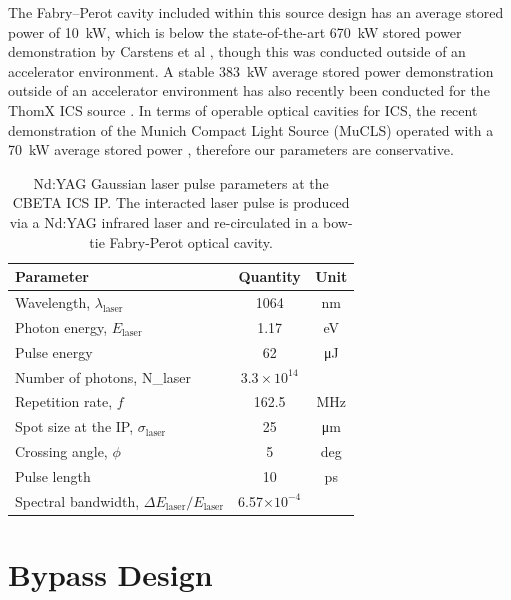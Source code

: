 \documentclass[../main.tex]{subfiles}
\begin{document}
The Fabry--Perot cavity included within this source design has an average stored power of 10~\si{\kilo\watt}, which is below the state-of-the-art 670~\si{\kilo\watt} stored power demonstration by Carstens et al \cite{carstens2014megawatt}, though this was conducted outside of an accelerator environment. A stable 383~\si{\kilo\watt} average stored power demonstration outside of an accelerator environment has also recently been conducted for the ThomX ICS source \cite{liu2018optical}. In terms of operable optical cavities for ICS, the recent demonstration of the Munich Compact Light Source (MuCLS) operated with a 70~\si{\kilo\watt} average stored power \cite{eggl2016munich}, therefore our parameters are conservative.   
\begin{table}[!h]
\centering
\caption{Nd:YAG Gaussian laser pulse parameters at the CBETA ICS IP. The interacted laser pulse is produced via a Nd:YAG infrared laser and re-circulated in a bow-tie Fabry-Perot optical cavity.}
\begin{tabular}{lcc}
\hline\hline
Parameter & Quantity & Unit \\
\hline
Wavelength, $\lambda_\textrm{laser}$ & 1064 & \si{\nano\meter}\\
Photon energy, $E_\textrm{laser}$ & 1.17 & \si{\electronvolt}\\
Pulse energy  & 62 & \si{\micro\joule}\\
Number of photons, N_{\textrm{laser}} & $3.3\times 10^{14}$\\ 
Repetition rate, $f$ & 162.5 & \si{\mega\hertz}\\
Spot size at the IP, $\sigma_\textrm{laser}$ & 25 & \si{\micro\meter}\\
Crossing angle, $\phi$ & 5 & deg \\
Pulse length  & 10 & \si{\pico\second}\\
Spectral bandwidth, $\Delta E_\textrm{laser}/E_\textrm{laser}$ & 6.57$\times 10^{-4}$ &   \\
\hline\hline
\end{tabular}
\label{tab:CBETA_laser_pulse_design_parameters}
\end{table}

\section{Bypass Design}
\label{sec:bypass_design}
\end{document}

